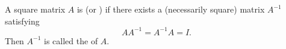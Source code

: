 A square matrix $A$ is  (or ) if there exists a (necessarily square) matrix $A^{-1}$ satisfying
$$
A A^{-1} = A^{-1} A = I.
$$
Then $A^{-1}$ is called the  of $A$.
